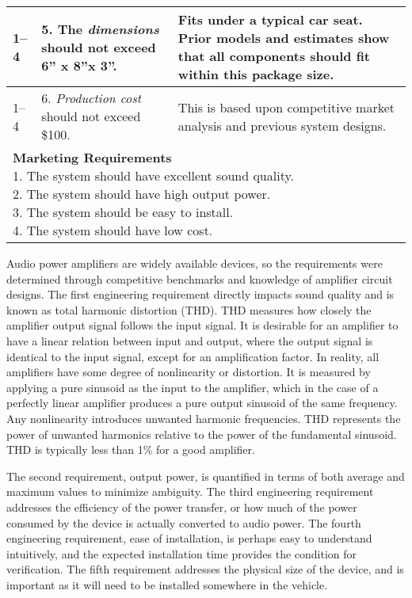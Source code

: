 \begin{longtable}{ |p{2.5cm}|p{5cm}|p{5cm}|}
1--4 & 
5.  The \emph{dimensions} should not exceed 6'' x 8''x 3''. &
Fits under a typical car seat. Prior models and
estimates show that all components should fit within this package
size. \\ \hline

1--4 & 
6.  \emph{Production cost} should not exceed \$100. &
This is based upon competitive market analysis and previous system designs. \\ \hline

\multicolumn{3}{|p{12cm}|}{
\textbf{Marketing Requirements}\newline
1.  The system should have excellent sound quality.\newline
2.  The system should have high output power.\newline
3.  The system should be easy to install.\newline
4.   The system should have low cost.
} \\ \hline
\end{longtable}

Audio power amplifiers are widely available devices, so the requirements
were determined through competitive benchmarks and knowledge of
amplifier circuit designs. The first engineering requirement directly
impacts sound quality and is known as total harmonic distortion (THD).
THD measures how closely the amplifier output signal follows the input
signal. It is desirable for an amplifier to have a linear relation
between input and output, where the output signal is identical to the
input signal, except for an amplification factor. In reality, all
amplifiers have some degree of nonlinearity or distortion. It is
measured by applying a pure sinusoid as the input to the amplifier,
which in the case of a perfectly linear amplifier produces a pure output
sinusoid of the same frequency. Any nonlinearity introduces unwanted
harmonic frequencies. THD represents the power of unwanted harmonics
relative to the power of the fundamental sinusoid. THD is typically less
than 1\% for a good amplifier.

The second requirement, output power, is quantified in terms of both
average and maximum values to minimize ambiguity. The third engineering
requirement addresses the efficiency of the power transfer, or how much
of the power consumed by the device is actually converted to audio
power. The fourth engineering requirement, ease of installation, is
perhaps easy to understand intuitively, and the expected installation
time provides the condition for verification. The fifth requirement
addresses the physical size of the device, and is important as it will
need to be installed somewhere in the vehicle.

